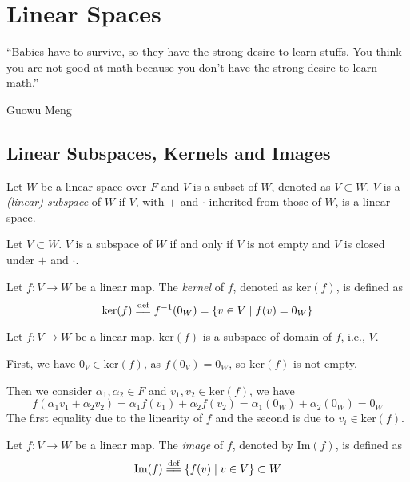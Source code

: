 \documentclass[
	11pt, %
	fleqn, %
	a4paper, %
]{LegrandOrangeBook}
\renewcommand{\ker}[1]{\text{ker}(#1)} %
\renewcommand{\Im}[1]{\text{Im}(#1)} %
\begin{document}
\chapter{Linear Spaces}

\epigraph{``Babies have to survive, so they have the strong desire to learn stuffs. You think you are not good at math because you don't have the strong desire to learn math.''}{Guowu Meng}

\section{Linear Subspaces, Kernels and Images}

\begin{definition}
    Let $W$ be a linear space over $F$ and $V$ is a subset of $W$, denoted as $V \subset W$. $V$ is a \emph{(linear) subspace} of $W$ if $V$, with $+$ and $\cdot$ inherited from those of $W$, is a linear space.
\end{definition}

\begin{proposition}
    Let $V \subset W$. $V$ is a subspace of $W$ if and only if $V$ is not empty and $V$ is closed under $+$ and $\cdot$.
\end{proposition}

\begin{definition}[Kernels]
    Let $f : V \to W$ be a linear map. The \emph{kernel} of $f$, denoted as $\ker f$, is defined as 
    \[
        \ker f \overset{\text{def}}{=\joinrel=} f^{-1}(0_W) = \{ v \in V \mid f(v) = 0_W \}
    \]
\end{definition}

\begin{example}
    Let $f : V \to W$ be a linear map. $\ker f$ is a subspace of domain of $f$, i.e., $V$.
    
    First, we have $0_V \in \ker f$, as $f(0_V) = 0_W$, so $\ker f$ is not empty.

    Then we consider $\alpha_1, \alpha_2 \in F$ and $v_1, v_2 \in \ker f$, we have
    \[
        f(\alpha_1 v_1 + \alpha_2 v_2) = \alpha_1 f(v_1) + \alpha_2 f(v_2) = \alpha_1 (0_W) + \alpha_2 (0_W) = 0_W
    \]
    The first equality due to the linearity of $f$ and the second is due to $v_i \in \ker f$.
\end{example}

\begin{definition}[Images]
    Let $f : V \to W$ be a linear map. The \emph{image} of $f$, denoted by $\Im f$, is defined as 
    \[
        \Im f \overset{\text{def}}{=\joinrel=} \{ f(v) \mid v \in V \} \subset W
    \]
\end{definition}
\end{document}
